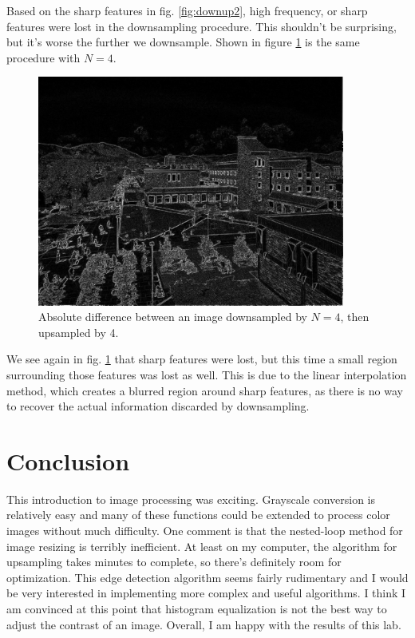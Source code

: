 \documentclass[11pt,a4paper]{article}
\begin{document}
Based on the sharp features in fig. \ref{fig:downup2}, high frequency, or sharp features were lost in the downsampling procedure. This shouldn't be surprising, but it's worse the further we downsample. Shown in figure \ref{fig:downup4} is the same procedure with $N=4$.

\clearpage

\begin{figure}[ht]
	\centering
	\includegraphics[width=0.9\textwidth]{figs/test01_downUp4_diff2}
	\caption{Absolute difference between an image downsampled by $N=4$, then upsampled by 4.}
	\label{fig:downup4}
\end{figure}

We see again in fig. \ref{fig:downup4} that sharp features were lost, but this time a small region surrounding those features was lost as well. This is due to the linear interpolation method, which creates a blurred region around sharp features, as there is no way to recover the actual information discarded by downsampling.

\clearpage

\section{Conclusion}
This introduction to image processing was exciting. Grayscale conversion is relatively easy and many of these functions could be extended to process color images without much difficulty. One comment is that the nested-loop method for image resizing is terribly inefficient. At least on my computer, the algorithm for upsampling takes minutes to complete, so there's definitely room for optimization. This edge detection algorithm seems fairly rudimentary and I would be very interested in implementing more complex and useful algorithms. I think I am convinced at this point that histogram equalization is not the best way to adjust the contrast of an image. Overall, I am happy with the results of this lab.
\end{document}
